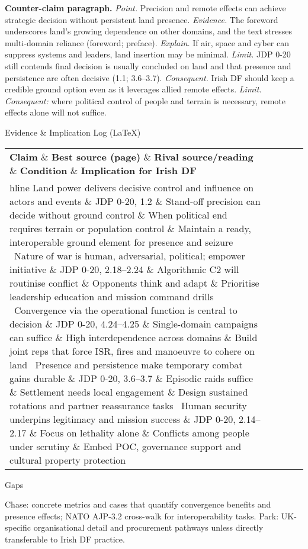 \textbf{Counter-claim paragraph.}
\textit{Point.} Precision and remote effects can achieve strategic decision without persistent land presence. \textit{Evidence.} The foreword underscores land’s growing dependence on other domains, and the text stresses multi-domain reliance (foreword; preface). \textit{Explain.} If air, space and cyber can suppress systems and leaders, land insertion may be minimal. \textit{Limit.} JDP 0-20 still contends final decision is usually concluded on land and that presence and persistence are often decisive (1.1; 3.6–3.7). \textit{Consequent.} Irish DF should keep a credible ground option even as it leverages allied remote effects. \textit{Limit. Consequent:} where political control of people and terrain is necessary, remote effects alone will not suffice.

Evidence \& Implication Log (LaTeX)

 
\begin{tabular}{p{3.2cm}p{4.2cm}p{3.6cm}p{3.2cm}p{4.2cm}}
	\textbf{Claim} \& \textbf{Best source (page)} \& \textbf{Rival source/reading} \& \textbf{Condition} \& \textbf{Implication for Irish DF}\\hline
	Land power delivers decisive control and influence on actors and events \& JDP 0-20, 1.2 \& Stand-off precision can decide without ground control \& When political end requires terrain or population control \& Maintain a ready, interoperable ground element for presence and seizure \
	Nature of war is human, adversarial, political; empower initiative \& JDP 0-20, 2.18–2.24 \& Algorithmic C2 will routinise conflict \& Opponents think and adapt \& Prioritise leadership education and mission command drills \
	Convergence via the operational function is central to decision \& JDP 0-20, 4.24–4.25 \& Single-domain campaigns can suffice \& High interdependence across domains \& Build joint reps that force ISR, fires and manoeuvre to cohere on land \
	Presence and persistence make temporary combat gains durable \& JDP 0-20, 3.6–3.7 \& Episodic raids suffice \& Settlement needs local engagement \& Design sustained rotations and partner reassurance tasks \
	Human security underpins legitimacy and mission success \& JDP 0-20, 2.14–2.17 \& Focus on lethality alone \& Conflicts among people under scrutiny \& Embed POC, governance support and cultural property protection \
\end{tabular}

Gaps

Chase: concrete metrics and cases that quantify convergence benefits and presence effects; NATO AJP-3.2 cross-walk for interoperability tasks.
Park: UK-specific organisational detail and procurement pathways unless directly transferable to Irish DF practice.

